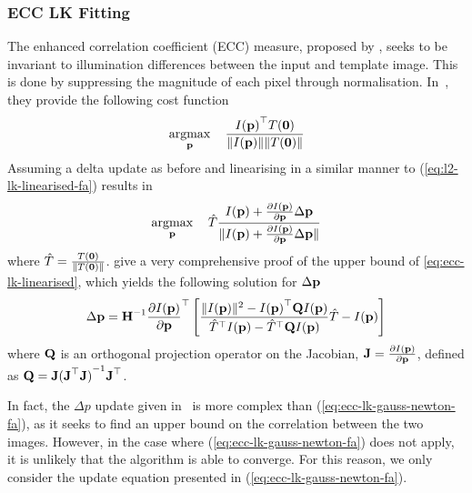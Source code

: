 \subsubsection{ECC LK Fitting}\label{subsubsec:lk-ecc}
The enhanced correlation coefficient (ECC) measure, proposed by
\citet{RefWorks:59}, seeks to be invariant to illumination differences
between the input and template image. This is done by suppressing the magnitude
of each pixel through normalisation. In~\cite{RefWorks:59}, they provide the
following cost function
\begin{equation}\label{eq:ecc-lk-max}
   \argmax_{\p} \quad \frac{{I(\p)}^{\top} T(\zero)}{\norm{I(\p)} \norm{T(\zero)}}
\end{equation}
Assuming a delta update as before and linearising in a similar manner to
(\ref{eq:l2-lk-linearised-fa}) results in
\begin{equation}\label{eq:ecc-lk-linearised}
    \argmax_{\p} \quad \hat{T} \frac{I(\p) + \frac{\partial I(\p)}{\partial \p} \Delta \p}{\norm{{I(\p) + \frac{\partial I(\p)}{\partial \p} \Delta \p}}}
\end{equation}
where $\hat{T} = \frac{T(\boldsymbol{\mathbf{0}})}{\lVert{} T(\boldsymbol{\mathbf{0}}) \rVert}$.
\citet{RefWorks:59} give a very comprehensive proof of
the upper bound of \cref{eq:ecc-lk-linearised}, which yields the
following solution for $\Delta \boldsymbol{\mathbf{p}}$
\begin{equation}\label{eq:ecc-lk-gauss-newton-fa}
    \Delta \boldsymbol{\mathbf{p}} = \boldsymbol{\mathbf{H}}^{-1} \frac{\partial I(\boldsymbol{\mathbf{p}})}{\partial \boldsymbol{\mathbf{p}}}^{\top} \left[ \frac{\lVert{} I(\boldsymbol{\mathbf{p}}) \rVert^2 - {I(\boldsymbol{\mathbf{p}})}^{\top} \boldsymbol{\mathbf{Q}} I(\boldsymbol{\mathbf{p}})}{\hat{T}^{\top} I(\boldsymbol{\mathbf{p}}) - \hat{T}^{\top} \boldsymbol{\mathbf{Q}} I(\boldsymbol{\mathbf{p}})} \hat{T} - I(\boldsymbol{\mathbf{p}}) \right]
\end{equation}
where $\boldsymbol{\mathbf{Q}}$ is an orthogonal projection operator on the Jacobian, $\boldsymbol{\mathbf{J}} =
\frac{\partial I(\boldsymbol{\mathbf{p}})}{\partial \boldsymbol{\mathbf{p}}}$, defined as $\boldsymbol{\mathbf{Q}} = \boldsymbol{\mathbf{J}} {(\boldsymbol{\mathbf{J}}^\top
\boldsymbol{\mathbf{J}})}^{-1} \boldsymbol{\mathbf{J}}^\top$.

In fact, the $\Delta p$ update given in~\cite{RefWorks:59} is more complex than
(\ref{eq:ecc-lk-gauss-newton-fa}), as it seeks to find an upper bound on the
correlation between the two images. However, in the case where 
(\ref{eq:ecc-lk-gauss-newton-fa}) does not apply, it is unlikely that the 
algorithm is able to converge. For this reason, we only consider the update 
equation presented in (\ref{eq:ecc-lk-gauss-newton-fa}).
